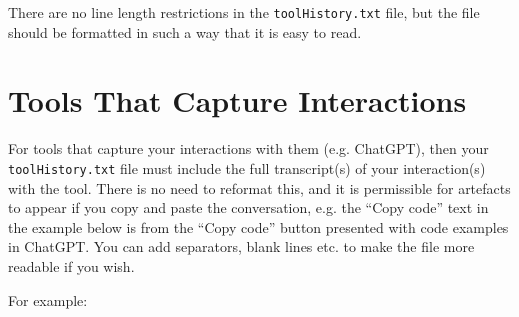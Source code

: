 \documentclass{article}
\begin{document}
There are no line length restrictions in the \texttt{toolHistory.txt} file,
but the file should be formatted in such a way that it is easy to read. 

\section{Tools That Capture Interactions}

For tools that capture your interactions with them (e.g. ChatGPT), then your \texttt{toolHistory.txt} file must include the full transcript(s) 
of your interaction(s) with the tool. There is no need to reformat this, and it is permissible for artefacts to appear if you copy and 
paste the conversation, e.g. the ``Copy code'' text  in the example below is from the ``Copy code'' button presented with code examples
in ChatGPT. You can add separators, blank lines etc. to make the file more readable if you wish.

For example:
\end{document}
